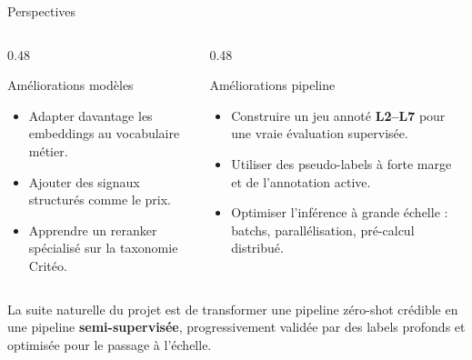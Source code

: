\documentclass[11pt,aspectratio=169]{beamer}
\begin{document}
\begin{frame}{Perspectives}
\small
\begin{columns}
\begin{column}{0.48\textwidth}
\begin{block}{Améliorations modèles}
\begin{itemize}
    \item Adapter davantage les embeddings au vocabulaire métier.
    \item Ajouter des signaux structurés comme le prix.
    \item Apprendre un reranker spécialisé sur la taxonomie Critéo.
\end{itemize}
\end{block}
\end{column}

\begin{column}{0.48\textwidth}
\begin{block}{Améliorations pipeline}
\begin{itemize}
    \item Construire un jeu annoté \textbf{L2--L7} pour une vraie évaluation supervisée.
    \item Utiliser des pseudo-labels à forte marge et de l'annotation active.
    \item Optimiser l'inférence à grande échelle : batchs, parallélisation, pré-calcul distribué.
\end{itemize}
\end{block}
\end{column}
\end{columns}

\vspace{0.25cm}

\begin{takeawaybox}
\centering
La suite naturelle du projet est de transformer une pipeline zéro-shot crédible en une pipeline \textbf{semi-supervisée}, progressivement validée par des labels profonds et optimisée pour le passage à l'échelle.
\end{takeawaybox}
\end{frame}
\end{document}
